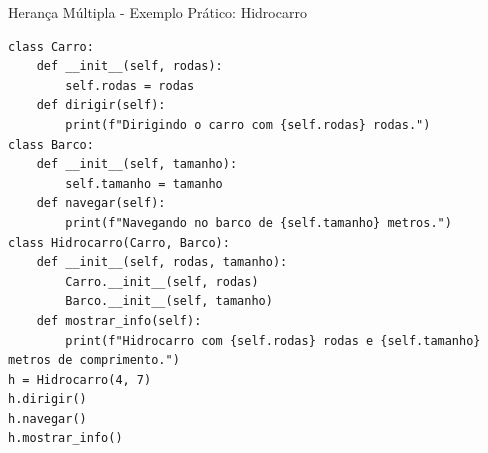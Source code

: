 \begin{frame}[fragile]{Herança Múltipla - Exemplo Prático: Hidrocarro}


    \scriptsize
    \begin{verbatim}
class Carro:
    def __init__(self, rodas):
        self.rodas = rodas
    def dirigir(self):
        print(f"Dirigindo o carro com {self.rodas} rodas.")
class Barco:
    def __init__(self, tamanho):
        self.tamanho = tamanho
    def navegar(self):
        print(f"Navegando no barco de {self.tamanho} metros.")
class Hidrocarro(Carro, Barco):
    def __init__(self, rodas, tamanho):
        Carro.__init__(self, rodas)
        Barco.__init__(self, tamanho)
    def mostrar_info(self):
        print(f"Hidrocarro com {self.rodas} rodas e {self.tamanho} metros de comprimento.")
h = Hidrocarro(4, 7)
h.dirigir()
h.navegar()
h.mostrar_info()
\end{verbatim}
\end{frame}